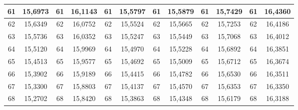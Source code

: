 \documentclass[a4paper,12pt]{article} %
\begin{document}
\begin{longtable}[c]{cccccccccc|c|c|}
	\multicolumn{1}{|c|}{61} & \multicolumn{1}{c|}{15,6973} & \multicolumn{1}{c|}{61} & \multicolumn{1}{c|}{16,1143} & \multicolumn{1}{c|}{61} & \multicolumn{1}{c|}{15,5797} & \multicolumn{1}{c|}{61} & \multicolumn{1}{c|}{15,5879} & \multicolumn{1}{c|}{61} & 15,7429 & 61 & 16,4360 \\ \hline
	\multicolumn{1}{|c|}{62} & \multicolumn{1}{c|}{15,6349} & \multicolumn{1}{c|}{62} & \multicolumn{1}{c|}{16,0752} & \multicolumn{1}{c|}{62} & \multicolumn{1}{c|}{15,5524} & \multicolumn{1}{c|}{62} & \multicolumn{1}{c|}{15,5665} & \multicolumn{1}{c|}{62} & 15,7253 & 62 & 16,4186 \\ \hline
	\multicolumn{1}{|c|}{63} & \multicolumn{1}{c|}{15,5736} & \multicolumn{1}{c|}{63} & \multicolumn{1}{c|}{16,0352} & \multicolumn{1}{c|}{63} & \multicolumn{1}{c|}{15,5247} & \multicolumn{1}{c|}{63} & \multicolumn{1}{c|}{15,5449} & \multicolumn{1}{c|}{63} & 15,7068 & 63 & 16,4012 \\ \hline
	\multicolumn{1}{|c|}{64} & \multicolumn{1}{c|}{15,5120} & \multicolumn{1}{c|}{64} & \multicolumn{1}{c|}{15,9969} & \multicolumn{1}{c|}{64} & \multicolumn{1}{c|}{15,4970} & \multicolumn{1}{c|}{64} & \multicolumn{1}{c|}{15,5228} & \multicolumn{1}{c|}{64} & 15,6892 & 64 & 16,3851 \\ \hline
	\multicolumn{1}{|c|}{65} & \multicolumn{1}{c|}{15,4513} & \multicolumn{1}{c|}{65} & \multicolumn{1}{c|}{15,9577} & \multicolumn{1}{c|}{65} & \multicolumn{1}{c|}{15,4692} & \multicolumn{1}{c|}{65} & \multicolumn{1}{c|}{15,5009} & \multicolumn{1}{c|}{65} & 15,6712 & 65 & 16,3674 \\ \hline
	\multicolumn{1}{|c|}{66} & \multicolumn{1}{c|}{15,3902} & \multicolumn{1}{c|}{66} & \multicolumn{1}{c|}{15,9189} & \multicolumn{1}{c|}{66} & \multicolumn{1}{c|}{15,4415} & \multicolumn{1}{c|}{66} & \multicolumn{1}{c|}{15,4782} & \multicolumn{1}{c|}{66} & 15,6530 & 66 & 16,3511 \\ \hline
	\multicolumn{1}{|c|}{67} & \multicolumn{1}{c|}{15,3300} & \multicolumn{1}{c|}{67} & \multicolumn{1}{c|}{15,8803} & \multicolumn{1}{c|}{67} & \multicolumn{1}{c|}{15,4137} & \multicolumn{1}{c|}{67} & \multicolumn{1}{c|}{15,4570} & \multicolumn{1}{c|}{67} & 15,6353 & 67 & 16,3350 \\ \hline
	\multicolumn{1}{|c|}{68} & \multicolumn{1}{c|}{15,2702} & \multicolumn{1}{c|}{68} & \multicolumn{1}{c|}{15,8420} & \multicolumn{1}{c|}{68} & \multicolumn{1}{c|}{15,3863} & \multicolumn{1}{c|}{68} & \multicolumn{1}{c|}{15,4348} & \multicolumn{1}{c|}{68} & 15,6179 & 68 & 16,3188 \\ \hline

\end{longtable}
\end{document}
